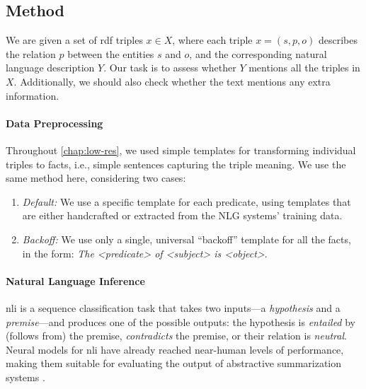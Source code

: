 \subsection{Method}
\label{sec:sem-acc:method}
We are given a set of \acs{rdf} triples $x \in X$, where each triple $x = (s, p, o)$ describes the relation $p$ between the entities $s$ and $o$, and the corresponding natural language description $Y$. Our task is to assess whether $Y$ mentions all the triples in $X$. Additionally, we should also check whether the text mentions any extra information.

\paragraph{Data Preprocessing} Throughout \autoref{chap:low-res}, we used simple templates for transforming individual triples to facts, i.e., simple sentences capturing the triple meaning.  We use the same method here, considering two cases:
\begin{enumerate}
    \item \emph{Default:} We use a specific template for each predicate, using templates that are either handcrafted or extracted from the NLG systems' training data.
    \item \emph{Backoff:} We use only a single, universal ``backoff'' template for all the facts, in the form: \emph{The \textless{}predicate\textgreater{} of \textless{}subject\textgreater{} is \textless{}object\textgreater{}}.
\end{enumerate}

\paragraph{Natural Language Inference} \ac{nli} is a sequence classification task that takes two inputs---a \textit{hypothesis} and a \textit{premise}---and produces one of the possible outputs: the hypothesis is \textit{entailed} by (follows from) the premise, \textit{contradicts} the premise, or their relation is \textit{neutral}. Neural models for \ac{nli} \cite{zhang2019semantics,liu-etal-2019-multi,liuRoBERTaRobustlyOptimized2019} have already reached near-human levels of performance, making them suitable for evaluating the output of abstractive summarization systems \cite{maynezFaithfulnessFactualityAbstractive2020}.


